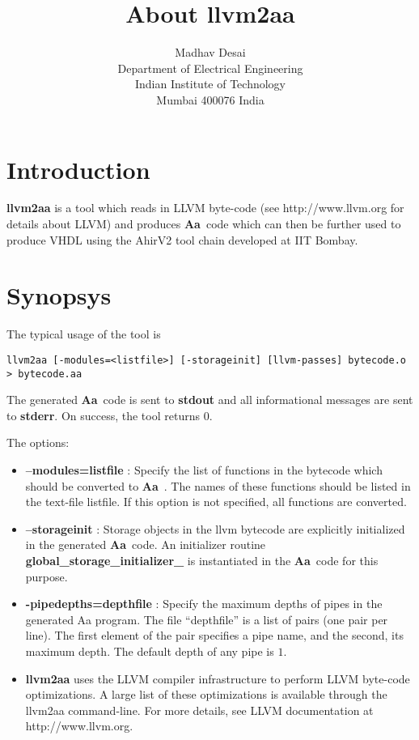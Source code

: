 \documentclass{article}
\title{About {\bf llvm2aa}}
\author{Madhav Desai \\ Department of Electrical Engineering \\ Indian Institute of Technology \\
	Mumbai 400076 India}
\newcommand{\Aa}{{\bf Aa}~}
\begin{document}
\maketitle

\section{Introduction}

{\bf llvm2aa}  is a tool which reads in LLVM byte-code (see http://www.llvm.org for
details about LLVM) and produces \Aa code which can then be further used
to produce VHDL using the AhirV2 tool chain developed at IIT Bombay.

\section{Synopsys}

The typical usage of the tool is 
\begin{verbatim}
llvm2aa [-modules=<listfile>] [-storageinit] [llvm-passes] bytecode.o > bytecode.aa
\end{verbatim}
The generated \Aa code is sent to {\bf stdout} and all informational
messages are sent to {\bf stderr}.  On success, the tool returns 0.

The options:
\begin{itemize}
\item {\bf --modules=listfile} : Specify the list of functions in the bytecode
which should be converted to \Aa.   The names of these functions should be
listed in the text-file listfile. If this option is not specified, all functions
are converted.
\item {\bf --storageinit} :  Storage objects in the llvm bytecode
are explicitly initialized in the generated \Aa code.   An initializer
routine {\bf global\_storage\_initializer\_} is instantiated in
the \Aa code for this purpose.
\item {\bf -pipedepths=depthfile} : Specify the maximum depths of
pipes in the generated Aa program. The file ``depthfile'' is a list
of pairs (one pair per line).  The first element of the pair specifies
a pipe name, and the second, its maximum depth.   The default depth
of any pipe is $1$.
\item {\bf llvm2aa} uses the LLVM compiler
infrastructure to perform LLVM byte-code optimizations.  A large list
of these optimizations is available through the llvm2aa command-line.
For more details, see LLVM documentation at http://www.llvm.org.
\end{itemize}
\end{document}
